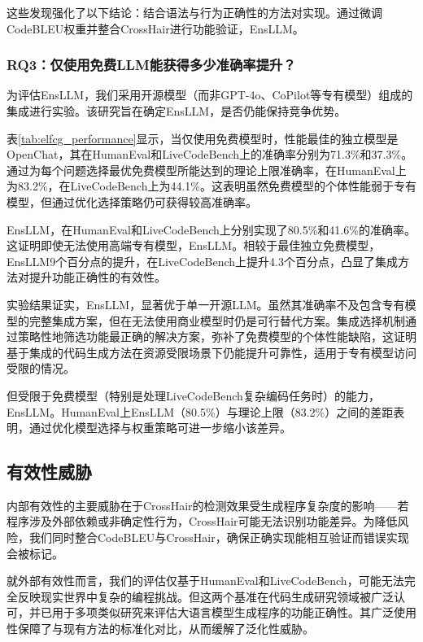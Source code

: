 \documentclass{article}
\newcommand{\tool}{EnsLLM}
\begin{document}
这些发现强化了以下结论：结合语法与行为正确性的方法对实现。通过微调CodeBLEU权重并整合CrossHair进行功能验证，\tool{}。
\subsubsection{RQ3：仅使用免费LLM能获得多少准确率提升？}

\leavevmode\par
为评估\tool{}，我们采用开源模型（而非GPT-4o、CoPilot等专有模型）组成的集成进行实验。该研究旨在确定\tool{}，是否仍能保持竞争优势。

表\ref{tab:elfcg_performance}显示，当仅使用免费模型时，性能最佳的独立模型是OpenChat，其在HumanEval和LiveCodeBench上的准确率分别为71.3\%和37.3\%。通过为每个问题选择最优免费模型所能达到的理论上限准确率，在HumanEval上为83.2\%，在LiveCodeBench上为44.1\%。这表明虽然免费模型的个体性能弱于专有模型，但通过优化选择策略仍可获得较高准确率。

\tool{}，在HumanEval和LiveCodeBench上分别实现了80.5\%和41.6\%的准确率。这证明即使无法使用高端专有模型，\tool{}。相较于最佳独立免费模型，\tool{}9个百分点的提升，在LiveCodeBench上提升4.3个百分点，凸显了集成方法对提升功能正确性的有效性。

实验结果证实，\tool{}，显著优于单一开源LLM。虽然其准确率不及包含专有模型的完整集成方案，但在无法使用商业模型时仍是可行替代方案。集成选择机制通过策略性地筛选功能最正确的解决方案，弥补了免费模型的个体性能缺陷，这证明基于集成的代码生成方法在资源受限场景下仍能提升可靠性，适用于专有模型访问受限的情况。

但受限于免费模型（特别是处理LiveCodeBench复杂编码任务时）的能力，\tool{}。HumanEval上\tool{}（80.5\%）与理论上限（83.2\%）之间的差距表明，通过优化模型选择与权重策略可进一步缩小该差异。
\subsection{有效性威胁}
内部有效性的主要威胁在于CrossHair的检测效果受生成程序复杂度的影响——若程序涉及外部依赖或非确定性行为，CrossHair可能无法识别功能差异。为降低风险，我们同时整合CodeBLEU与CrossHair，确保正确实现能相互验证而错误实现会被标记。

就外部有效性而言，我们的评估仅基于HumanEval和LiveCodeBench，可能无法完全反映现实世界中复杂的编程挑战。但这两个基准在代码生成研究领域被广泛认可，并已用于多项类似研究来评估大语言模型生成程序的功能正确性。其广泛使用性保障了与现有方法的标准化对比，从而缓解了泛化性威胁。
\end{document}
